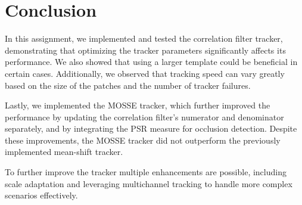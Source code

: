 \documentclass[9pt]{IEEEtran}
\begin{document}
\section{Conclusion}
In this assignment, we implemented and tested the correlation filter tracker, demonstrating that 
optimizing the tracker parameters significantly affects its performance. We also showed that using a
 larger template could be beneficial in certain cases. Additionally, we observed that tracking speed 
 can vary greatly based on the size of the patches and the number of tracker failures.

Lastly, we implemented the MOSSE tracker, which further improved the performance by updating the correlation
 filter’s numerator and denominator separately, and by integrating the PSR measure for occlusion detection.
  Despite these improvements, the MOSSE tracker did not outperform the previously implemented mean-shift tracker.

To further improve the tracker multiple enhancements are possible, including scale adaptation and leveraging multichannel 
tracking to handle more complex scenarios effectively.





\end{document}
